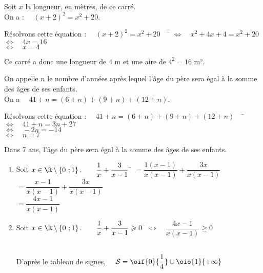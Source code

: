 \documentclass[a4paper,11pt,exos]{nsi} %
\begin{document}
\exo{}
Soit $x$ la longueur, en mètres, de ce carré.\\
On a  : $\quad (x+2)^2=x^2+20$.
\begin{tabbing}
	Résolvons cette équation : $\quad (x+2)^2=x^2+20 \quad$	\= $\iff \quad x^2+4x+4=x^2+20$\\
	\>	$\iff\quad 4x=16$\\
	\>	$\iff\quad x=4$
\end{tabbing}
Ce carré a donc une longueur de $4$ m et une aire de $4^2=16$ m².

\exo{}
On appelle $n$ le nombre d'années après lequel l'âge du père sera égal à la somme des âges de ses enfants.\\
On a $\quad 41+n=(6+n)+(9+n)+(12+n)$.
\begin{tabbing}
	Résolvons cette équation : $\quad 41+n=(6+n)+(9+n)+(12+n)\quad$ \=	$\iff\quad 41+n=3n+27$\\[.5em]
	\>	$\iff\quad -2n=-14$\\
	\>	$\iff\quad n=7$
\end{tabbing}
Dans 7 ans, l'âge du père sera égal à la somme des âges de ses enfants.


\exo{}
\begin{enumerate}
	\item 	%
	\begin{tabbing}
		Soit $x\in\R\setminus\left\{0\ ;1\right\}.\qquad \dfrac{1}{x}+\dfrac{3}{x-1}$	\=	$=\dfrac{1(x-1)}{x(x-1)}+\dfrac{3x}{x(x-1)}$\\[.5em]
		\>	$=\dfrac{x-1}{x(x-1)}+\dfrac{3x}{x(x-1)}$\\[.5em]
		\>	$=\dfrac{4x-1}{x(x-1)}$
	\end{tabbing}
	
	\item 	%
	\begin{tabbing}
		Soit $x\in\R\setminus\left\{0\ ;1\right\}.\qquad \dfrac{1}{x}+\dfrac{3}{x-1}\geqslant 0$	\=	$\iff \quad \dfrac{4x-1}{x(x-1)}\geqslant 0$
	\end{tabbing}
		\\[.5em]
	D'après le tableau de signes, $\quad\mathcal{S}=\oif{0}{\dfrac{1}{4}}\cup\oio{1}{+\infty}$
\end{enumerate}
\end{document}
